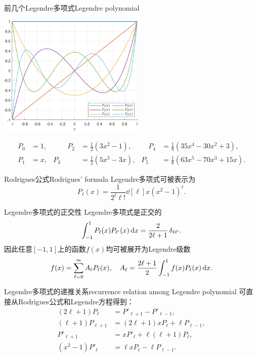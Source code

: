 \begin{example}{前几个Legendre多项式}{Legendre polynomial}
    \begin{center}
        \includegraphics[width=7cm]{figures/Legendre.pdf}
    \end{center}
    \begin{equation*}
        \begin{aligned}
            P_0&=1,&\qquad P_2&=\frac12(3x^2-1),&\quad P_4&=\frac18(35x^4-30x^2+3),\\
            P_1&=x,&P_3&=\frac12(5x^3-3x),&P_5&=\frac18(63x^5-70x^3+15x).
        \end{aligned}
    \end{equation*}
\end{example}
\begin{theorem}{Rodrigues公式}{Rodrigues' formula}
    Legendre多项式可被表示为
    \begin{equation}
        \label{eqn:Rodrigues}
        P_\ell(x)=\frac1{2^\ell\ell!}\dd[\ell]x(x^2-1)^\ell.
    \end{equation}
\end{theorem}
\begin{theorem}
    {Legendre多项式的正交性}{}
    Legendre多项式是正交的
    \[
        \int_{-1}^1P_\ell(x)P_{\ell'}(x)\mathop{}\!\mathrm{d} x=\frac2{2\ell+1}\mathop{}\!\delta_{\ell\ell'}.
    \]
    因此任意$[-1,1]$上的函数$f(x)$均可被展开为Legendre级数
    \[
        f(x)=\sum_{\ell=0}^\infty A_\ell P_\ell(x),\quad A_\ell=\frac{2\ell+1}2\int_{-1}^1f(x)P_\ell(x)\mathop{}\!\mathrm{d} x.
    \]
\end{theorem}
\begin{theorem}{Legendre多项式的递推关系}{recurrence relation among Legendre polynomial}
    可直接从Rodrigues公式和Legendre方程得到：
    \begin{subequations}
        \begin{align}
            \label{eqn:Legendre recurrence 1}
            (2\ell+1)P_\ell&=P'_{\ell+1}-P'_{\ell-1},\\
            (\ell+1)P_{\ell+1}&=(2\ell+1)xP_\ell+\ell P_{\ell-1},\\
            P'_{\ell+1}&=xP'_\ell+\ell(\ell+1)P_\ell,\\
            (x^2-1)P'_\ell&=\ell xP_\ell-\ell P_{\ell-1}.
        \end{align}
    \end{subequations}
\end{theorem}
